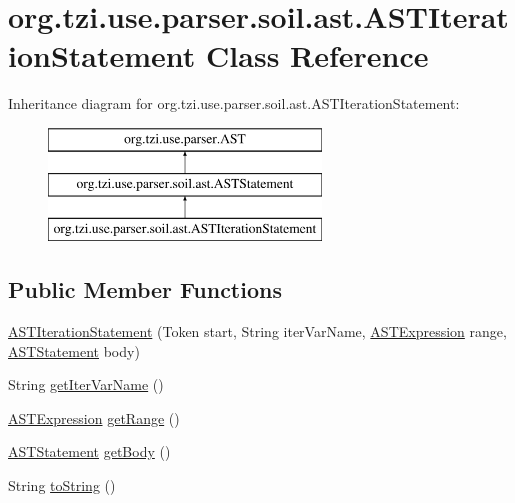 \hypertarget{classorg_1_1tzi_1_1use_1_1parser_1_1soil_1_1ast_1_1_a_s_t_iteration_statement}{\section{org.\-tzi.\-use.\-parser.\-soil.\-ast.\-A\-S\-T\-Iteration\-Statement Class Reference}
\label{classorg_1_1tzi_1_1use_1_1parser_1_1soil_1_1ast_1_1_a_s_t_iteration_statement}
}
Inheritance diagram for org.\-tzi.\-use.\-parser.\-soil.\-ast.\-A\-S\-T\-Iteration\-Statement\-:\begin{figure}[H]
\begin{center}
\leavevmode
\includegraphics[height=3.000000cm]{classorg_1_1tzi_1_1use_1_1parser_1_1soil_1_1ast_1_1_a_s_t_iteration_statement}
\end{center}
\end{figure}
\subsection*{Public Member Functions}
\begin{DoxyCompactItemize}
\item 
\hyperlink{classorg_1_1tzi_1_1use_1_1parser_1_1soil_1_1ast_1_1_a_s_t_iteration_statement_ac0e95fe841a1bf90867037b426d06214}{A\-S\-T\-Iteration\-Statement} (Token start, String iter\-Var\-Name, \hyperlink{classorg_1_1tzi_1_1use_1_1parser_1_1ocl_1_1_a_s_t_expression}{A\-S\-T\-Expression} range, \hyperlink{classorg_1_1tzi_1_1use_1_1parser_1_1soil_1_1ast_1_1_a_s_t_statement}{A\-S\-T\-Statement} body)
\item 
String \hyperlink{classorg_1_1tzi_1_1use_1_1parser_1_1soil_1_1ast_1_1_a_s_t_iteration_statement_aabfd407d0ce6f0b89e615b1207ca4758}{get\-Iter\-Var\-Name} ()
\item 
\hyperlink{classorg_1_1tzi_1_1use_1_1parser_1_1ocl_1_1_a_s_t_expression}{A\-S\-T\-Expression} \hyperlink{classorg_1_1tzi_1_1use_1_1parser_1_1soil_1_1ast_1_1_a_s_t_iteration_statement_a837eca532fe11d0e29d631fa7de1f08a}{get\-Range} ()
\item 
\hyperlink{classorg_1_1tzi_1_1use_1_1parser_1_1soil_1_1ast_1_1_a_s_t_statement}{A\-S\-T\-Statement} \hyperlink{classorg_1_1tzi_1_1use_1_1parser_1_1soil_1_1ast_1_1_a_s_t_iteration_statement_ad2cefd0f0172f3e4cff9f2cacd50606f}{get\-Body} ()
\item 
String \hyperlink{classorg_1_1tzi_1_1use_1_1parser_1_1soil_1_1ast_1_1_a_s_t_iteration_statement_ac68762043cbbfc9529daa89afd94ad76}{to\-String} ()
\end{DoxyCompactItemize}
